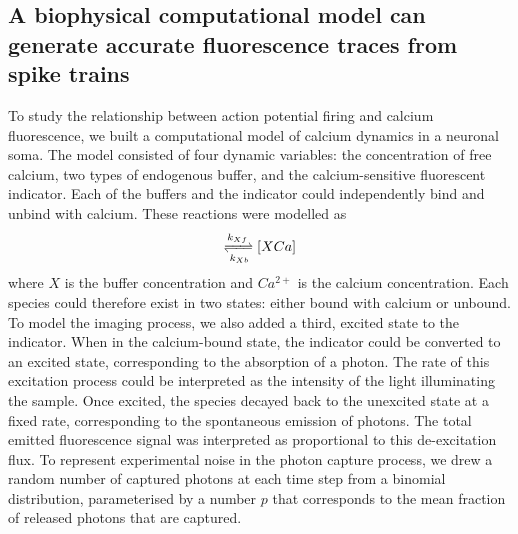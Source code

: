 \documentclass[a4paper,12pt]{article}
\theoremstyle{definition}
\begin{document}
\subsection{A biophysical computational model can generate accurate fluorescence traces from spike trains}
To study the relationship between action potential firing and calcium fluorescence, we built a computational model of calcium dynamics in a neuronal soma. The model consisted of four dynamic variables: the concentration of free calcium, two types of endogenous buffer, and the calcium-sensitive fluorescent indicator. Each of the buffers and the indicator could independently bind and unbind with calcium. These reactions were modelled as
\begin{align*}
   [X][Ca^{2+}] \xrightleftharpoons[k_{Xb}]{k_{Xf}} [XCa]
\end{align*}
where $X$ is the buffer concentration and $Ca^{2+}$ is the calcium concentration. Each species could therefore exist in two states: either bound with calcium or unbound. To model the imaging process, we also added a third, excited state to the indicator. When in the calcium-bound state, the indicator could be converted to an excited state, corresponding to the absorption of a photon. The rate of this excitation process could be interpreted as the intensity of the light illuminating the sample. Once excited, the species decayed back to the unexcited state at a fixed rate, corresponding to the spontaneous emission of photons. The total emitted fluorescence signal was interpreted as proportional to this de-excitation flux. To represent experimental noise in the photon capture process, we drew a random number of captured photons at each time step from a binomial distribution, parameterised by a number $p$ that corresponds to the mean fraction of released photons that are captured.
\end{document}
